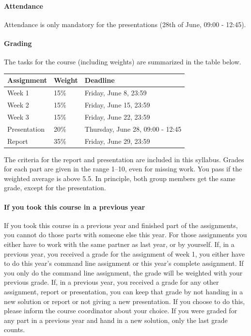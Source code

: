 \documentclass[a4paper]{report}
\begin{document}
\paragraph{Attendance}
Attendance is only mandatory for the presentations (28th of June, 09:00 - 12:45).


\paragraph{Grading}
The tasks for the course (including weights) are summarized in the table below.

\begin{table}[h!]
	\begin{tabular}{| l | l | l |}
		\hline
		\textbf{Assignment} & \textbf{Weight}	& \textbf{Deadline}					\\
		\hline
		Week 1				&	15\%			& Friday, June 8, 23:59				\\
		\hline
		Week 2				&	15\%			& Friday, June 15, 23:59			\\
		\hline
		Week 3				&	15\%			& Friday, June 22, 23:59			\\
		\hline
		Presentation		&	20\%			& Thursday, June 28, 09:00 - 12:45	\\
		\hline
		Report				&	35\%			& Friday, June 29, 23:59			\\
		\hline
	\end{tabular}
\end{table}
The criteria for the report and presentation are included in this syllabus.
Grades for each part are given in the range 1--10, even for missing work. You pass if the weighted average is above 5.5. In principle, both group members get the same grade, except for the presentation.

\paragraph{If you took this course in a previous year}
If you took this course in a previous year and finished part of the assignments, you cannot do those parts with someone else this year. For those assignments you either have to work with the same partner as last year, or by yourself.
If, in a previous year, you received a grade for the assignment of week 1, you either have to do this year's command line assignment or this year's complete assignment. If you only do the command line assignment, the grade will be weighted with your previous grade.
If, in a previous year, you received a grade for any other assignment, report or presentation, you can keep that grade by not handing in a new solution or report or not giving a new presentation. If you choose to do this, please inform the course coordinator about your choice.
If you were graded for any part in a previous year and hand in a new solution, only the last grade counts.
\end{document}

